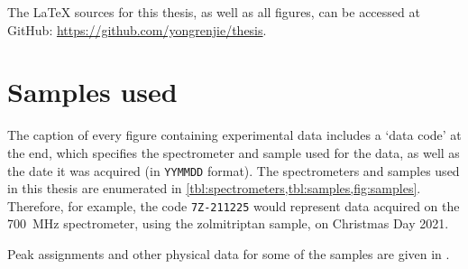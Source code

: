 The \LaTeX{} sources for this thesis, as well as all figures, can be accessed at GitHub: \url{https://github.com/yongrenjie/thesis}.


\section*{Samples used}

The caption of every figure containing experimental data includes a `data code' at the end, which specifies the spectrometer and sample used for the data, as well as the date it was acquired (in \texttt{YYMMDD} format).
The spectrometers and samples used in this thesis are enumerated in \cref{tbl:spectrometers,tbl:samples,fig:samples}.
Therefore, for example, the code \texttt{7Z-211225} would represent data acquired on the \qty{700}{\MHz} spectrometer, using the zolmitriptan sample, on Christmas Day 2021.

Peak assignments and other physical data for some of the samples are given in .

